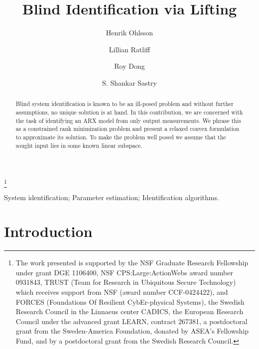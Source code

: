 \documentclass{ifacconf}
\newcommand{\0}{{\bf 0}}
\begin{document}
\begin{frontmatter}

\title{Blind Identification via Lifting} 

\thanks[footnoteinfo]{The work presented is supported by the NSF
Graduate Research Fellowship under grant DGE 1106400, NSF
CPS:Large:ActionWebs award number 0931843, TRUST (Team for Research in
Ubiquitous Secure Technology) which receives support from NSF (award
number CCF-0424422), and FORCES (Foundations Of Resilient
CybEr-physical Systems), the Swedish Research
  Council in the Linnaeus center CADICS, the European Research Council
   under the advanced grant LEARN, contract 267381, a postdoctoral grant from the Sweden-America
   Foundation, donated by ASEA's Fellowship Fund, and  by a postdoctoral
   grant from the Swedish Research Council.}

\author[Ber,Liu]{Henrik Ohlsson} 
\author[Ber]{Lillian Ratliff} 
\author[Ber]{Roy Dong}
\author[Ber]{S. Shankar Sastry}

\address[Ber]{Department of Electrical Engineering and Computer
  Sciences, University of California, Berkeley, CA, USA (e-mail:
  ohlsson@eecs.berkeley.edu).}                                              
\address[Liu]{Division of Automatic Control, Department of Electrical Engineering, Link\"oping University, Sweden.}


          
\begin{keyword}                           System identification; Parameter 
        estimation; Identification
        algorithms. \end{keyword}                             


\begin{abstract}                          Blind system identification  is known to be an ill-posed problem and
without further assumptions, no unique solution is at hand. In this contribution, we are concerned with the task of identifying an ARX model
from only output measurements. 
We phrase this as a constrained
rank minimization problem and present a relaxed convex formulation to approximate
its solution. To make the problem well posed we assume that the sought
input lies in some known linear subspace.
\end{abstract}

\end{frontmatter}

\section{Introduction}
\end{document}
